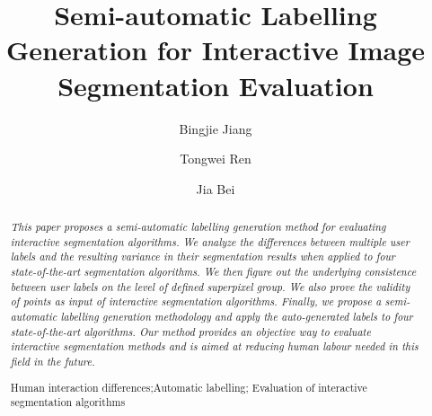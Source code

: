 \documentclass[runningheads,a4paper]{llncs}
\newcommand{\keywords}[1]{\par\addvspace\baselineskip
\noindent\keywordname\enspace\ignorespaces#1}
\begin{document}
\mainmatter  %

\title{Semi-automatic Labelling Generation for Interactive Image Segmentation Evaluation}


%
%
\author{Bingjie Jiang \and Tongwei Ren \and Jia Bei}
%


\maketitle


\begin{abstract}
\emph{This paper proposes a semi-automatic labelling generation method for evaluating interactive segmentation algorithms. We analyze the differences between multiple user labels and the resulting variance in their segmentation results when applied to four state-of-the-art segmentation algorithms. We then figure out the underlying consistence between user labels on the level of defined superpixel group. We also prove the validity of points as input of interactive segmentation algorithms. Finally, we propose a semi-automatic labelling generation methodology and apply the auto-generated labels to four state-of-the-art algorithms. Our method provides an objective way to evaluate interactive segmentation methods and is aimed at reducing human labour needed in this field in the future.
}

\keywords{Human interaction differences;Automatic labelling; Evaluation of interactive segmentation algorithms}
\end{abstract}
\end{document}
